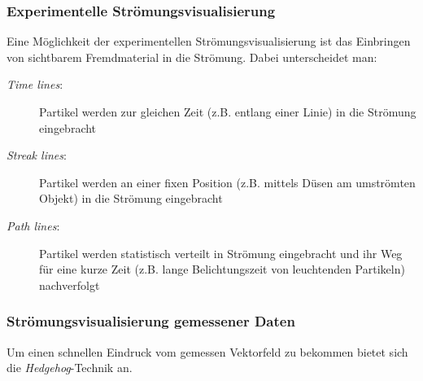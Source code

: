 \documentclass[12pt,a4paper,oneside,normalheadings,abstracton,liststotoc,bibtotoc,titlepage,pdftex]{scrbook}
\begin{document}
\subsubsection{Experimentelle Strömungsvisualisierung}
Eine Möglichkeit der experimentellen Strömungsvisualisierung ist das Einbringen von sichtbarem Fremdmaterial in die Strömung. Dabei unterscheidet man:
\begin{description}
\item[\textit{Time lines}:] Partikel werden zur gleichen Zeit (z.B. entlang einer Linie) in die Strömung eingebracht
\item[\textit{Streak lines}:] Partikel werden an einer fixen Position (z.B. mittels Düsen am umströmten Objekt) in die Strömung eingebracht
\item[\textit{Path lines}:] Partikel werden statistisch verteilt in Strömung eingebracht und ihr Weg für eine kurze Zeit (z.B. lange Belichtungszeit von leuchtenden Partikeln) nachverfolgt
\end{description}

\subsubsection{Strömungsvisualisierung gemessener Daten}
Um einen schnellen Eindruck vom gemessen Vektorfeld zu bekommen bietet sich die \textit{Hedgehog}-Technik an.
\end{document}
